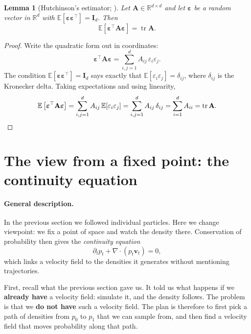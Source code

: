 \documentclass[11pt,a4paper]{article}
\numberwithin{equation}{section}     %
\theoremstyle{plain}        %
\newtheorem{lemma}[theorem]{Lemma}
\theoremstyle{definition}   %
\theoremstyle{remark}       %
\begin{document}
\begin{lemma}[Hutchinson's estimator; \citealp{hutchinson1989}]\label{lem:hutch}
Let $\mathbf{A}\in\mathbb{R}^{d\times d}$ and let $\boldsymbol{\varepsilon}$ be a random vector in $\mathbb{R}^d$ with $\mathbb{E}\left[\boldsymbol{\varepsilon}\boldsymbol{\varepsilon}^\top\right]=\mathbf{I}_d$. Then
\[
\mathbb{E}\left[\boldsymbol{\varepsilon}^\top\mathbf{A}\boldsymbol{\varepsilon}\right]=\operatorname{tr}\mathbf{A} .
\]
\end{lemma}

\begin{proof}
Write the quadratic form out in coordinates:
\[
\boldsymbol{\varepsilon}^\top\mathbf{A}\boldsymbol{\varepsilon}=\sum_{i,j=1}^d A_{ij}\,\varepsilon_i\varepsilon_j .
\]
The condition $\mathbb{E}[\boldsymbol{\varepsilon}\boldsymbol{\varepsilon}^\top]=\mathbf{I}_d$ says exactly that $\mathbb{E}[\varepsilon_i\varepsilon_j]=\delta_{ij}$, where $\delta_{ij}$ is the Kronecker delta. Taking expectations and using linearity,
\[
\mathbb{E}\left[\boldsymbol{\varepsilon}^\top\mathbf{A}\boldsymbol{\varepsilon}\right]=\sum_{i,j=1}^d A_{ij}\,\mathbb{E}[\varepsilon_i\varepsilon_j]=\sum_{i,j=1}^d A_{ij}\,\delta_{ij}=\sum_{i=1}^d A_{ii}=\operatorname{tr}\mathbf{A} . \qedhere
\]
\end{proof}

\newpage

\section{The view from a fixed point: the continuity equation}\label{sec:continuity}

\paragraph{General description.} In the previous section we followed individual particles. Here we change viewpoint: we fix a point of space and watch the density there. Conservation of probability then gives the \emph{continuity equation} \citep{villani2009,ambrosio2008}
\[
\partial_t p_t + \nabla\cdot\left(p_t\mathbf{v}_t\right) = 0,
\]
which links a velocity field to the densities it generates without mentioning trajectories.

First, recall what the previous section gave us. It told us what happens if we \textbf{already have} a velocity field: simulate it, and the density follows. The problem is that we \textbf{do not have} such a velocity field. The plan is therefore to first pick a path of densities from $p_0$ to $p_1$ that we can sample from, and then find a velocity field that moves probability along that path.
\end{document}
